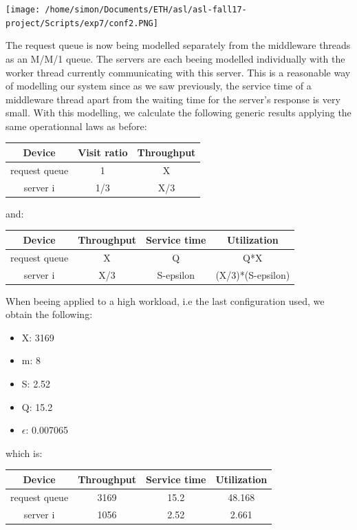 \documentclass[11pt,a4paper]{article}
\begin{document}
\begin{center} 
\texttt{[image: /home/simon/Documents/ETH/asl/asl-fall17-project/Scripts/exp7/conf2.PNG]}
\end{center} 
The request queue is now being modelled separately from the middleware threads as an M/M/1 queue. The servers are each beeing modelled individually with the worker thread currently communicating with this server. This is a reasonable way of modelling our system since as we saw previously, the service time of a middleware thread apart from the waiting time for the server's response is very small. With this modelling, we calculate the following generic results applying the same operationnal laws as before:
 \begin{center}
		\begin{tabular}{|c|c|c|}
			  \hline
			  \textbf{Device} & \textbf{Visit ratio} & \textbf{Throughput} \\
			  \hline
			  request queue & 1 & X \\
			  server i & 1/3 & X/3   \\
			  \hline
		\end{tabular}
 \end{center}
 and:
 \begin{center}

		\begin{tabular}{|c|c|c|c|}
			  \hline
			  \textbf{Device} & \textbf{Throughput} & \textbf{Service time} & \textbf{Utilization} \\
			  \hline
			  request queue  &X  & Q  & Q*X\\
			  server i & X/3 & S-epsilon &(X/3)*(S-epsilon)  \\
			  \hline
		\end{tabular}
 \end{center}
 When beeing applied to a high workload, i.e the last configuration used, we obtain the following:
 \begin{itemize}
\item X: 3169
\item m: 8
\item S: 2.52
\item Q: 15.2
\item \(\epsilon \): 0.007065
\end{itemize}
which is:
 \begin{center}

		\begin{tabular}{|c|c|c|c|}
			  \hline
			  \textbf{Device} & \textbf{Throughput} & \textbf{Service time} & \textbf{Utilization} \\
			  \hline
			  request queue  &3169  & 15.2  &48.168 \\
			  server i & 1056 & 2.52 &2.661 \\
			  \hline
		\end{tabular}
 \end{center}
\end{document}
